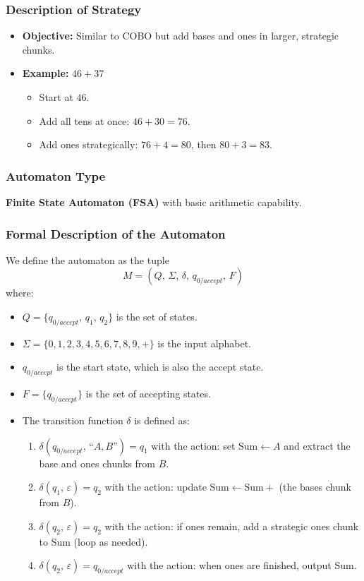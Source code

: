 \documentclass[11pt]{article}
\begin{document}
\subsubsection*{Description of Strategy}
\begin{itemize}
    \item \textbf{Objective:} Similar to COBO but add bases and ones in larger, strategic chunks.
    \item \textbf{Example:} \(46 + 37\)
    \begin{itemize}
        \item Start at \(46\).
        \item Add all tens at once: \(46 + 30 = 76\).
        \item Add ones strategically: \(76 + 4 = 80\), then \(80 + 3 = 83\).
    \end{itemize}
\end{itemize}

\subsubsection*{Automaton Type}
\textbf{Finite State Automaton (FSA)} with basic arithmetic capability.

\subsubsection*{Formal Description of the Automaton}

We define the automaton as the tuple
\[
M = (Q,\,\Sigma,\,\delta,\,q_{0/accept},\,F)
\]
where:
\begin{itemize}
    \item \(Q = \{q_{0/accept},\, q_1,\, q_2\}\) is the set of states.
    \item \(\Sigma = \{0,1,2,3,4,5,6,7,8,9,+\}\) is the input alphabet.
    \item \(q_{0/accept}\) is the start state, which is also the accept state.
    \item \(F = \{q_{0/accept}\}\) is the set of accepting states.
    \item The transition function \(\delta\) is defined as:
    \begin{enumerate}
        \item \(\delta(q_{0/accept},\, \text{``}A,B\text{''}) = q_1\) \quad with the action: set \(\text{Sum} \gets A\) and extract the base and ones chunks from \(B\).
        \item \(\delta(q_1,\, \varepsilon) = q_2\) \quad with the action: update \(\text{Sum} \gets \text{Sum} +\) (the bases chunk from \(B\)).
        \item \(\delta(q_2,\, \varepsilon) = q_2\) \quad with the action: if ones remain, add a strategic ones chunk to \(\text{Sum}\) (loop as needed).
        \item \(\delta(q_2,\, \varepsilon) = q_{0/accept}\) \quad with the action: when ones are finished, output \(\text{Sum}\).
    \end{enumerate}
\end{itemize}
\end{document}

